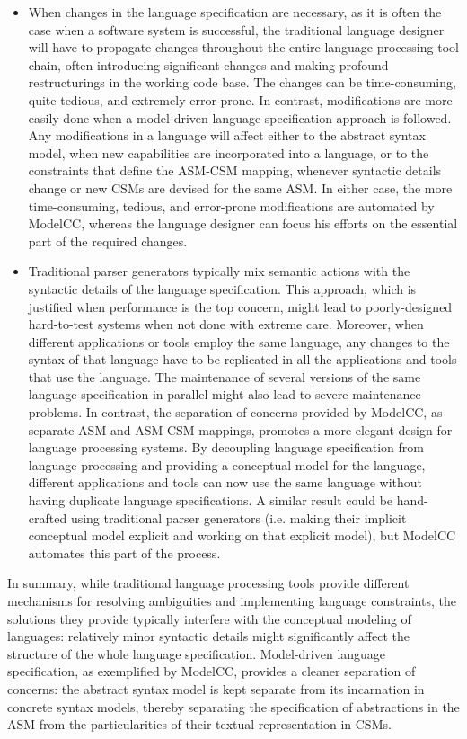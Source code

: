 \documentclass[preprint]{elsarticle}
\begin{document}
\begin{itemize}
\item
When changes in the language specification are necessary, as it is often the case when a software system is successful, the traditional language designer will have to propagate changes throughout the entire language processing tool chain, often introducing significant changes and making profound restructurings in the working code base.
The changes can be time-consuming, quite tedious, and extremely error-prone.
In contrast, modifications are more easily done when a model-driven language specification approach is followed.
Any modifications in a language will affect either to the abstract syntax model, when new capabilities are incorporated into a language, or to the constraints that define the ASM-CSM mapping, whenever syntactic details change or new CSMs are devised for the same ASM.
In either case, the more time-consuming, tedious, and error-prone modifications are automated by ModelCC, whereas the language designer can focus his efforts on the essential part of the required changes.

\item
Traditional parser generators typically mix semantic actions with the syntactic details of the language specification.
This approach, which is justified when performance is the top concern, might lead to poorly-designed hard-to-test systems when not done with extreme care.
Moreover, when different applications or tools employ the same language, any changes to the syntax of that language have to be replicated in all the applications and tools that use the language.
The maintenance of several versions of the same language specification in parallel might also lead to severe maintenance problems.
In contrast, the separation of concerns provided by ModelCC, as separate ASM and ASM-CSM mappings, promotes a more elegant design for language processing systems.
By decoupling language specification from language processing and providing a conceptual model for the language, different applications and tools can now use the same language without having duplicate language specifications.
A similar result could be hand-crafted using traditional parser generators (i.e. making their implicit conceptual model explicit and working on that explicit model), but ModelCC automates this part of the process.

\end{itemize}

In summary, while traditional language processing tools provide different mechanisms for resolving ambiguities and implementing language constraints, the solutions they provide typically interfere with the conceptual modeling of languages: relatively minor syntactic details might significantly affect the structure of the whole language specification.
Model-driven language specification, as exemplified by ModelCC, provides a cleaner separation of concerns: the abstract syntax model is kept separate from its incarnation in concrete syntax models, thereby separating the specification of abstractions in the ASM from the particularities of their textual representation in CSMs.
\end{document}
